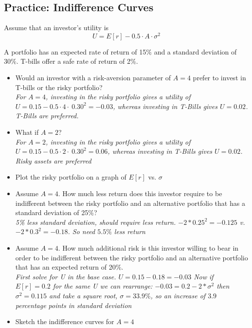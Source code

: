 \documentclass[11pt]{article}
\theoremstyle{definition}
\begin{document}
    \begin{shaded}
    \subsection{Practice: Indifference Curves}
    Assume that an investor's utility is
        $$U = E[r] - 0.5 \cdot A \cdot \sigma^2$$ 

    A portfolio has an expected rate of return of 15\% and a standard deviation of 30\%.  T-bills offer a safe rate of return of 2\%.   
    \begin{itemize}
        \item Would an investor with a risk-aversion parameter of $A=4$ prefer to invest in T-bills or the risky portfolio?   \\
        
        \textit{For $A=4$, investing in the risky portfolio gives a utility of $U = 0.15 - 0.5\cdot 4 \cdot \ 0.30^2 = -0.03$, whereas investing in T-Bills gives $U = 0.02$.   T-Bills are preferred.\\}
        \item What if $A=2$?\\
        
        \textit{For $A=2$, investing in the risky portfolio gives a utility of $U = 0.15 - 0.5\cdot 2 \cdot \ 0.30^2 = 0.06$, whereas investing in T-Bills gives $U = 0.02$.   Risky assets are preferred}

        \item Plot the risky portfolio on a graph of $E[r]$ vs. $\sigma$
        \item Assume $A=4$.   How much less return does this investor require to be indifferent between the risky portfolio and an alternative portfolio that has a standard deviation of 25\%?\\

        \textit{5\% less standard deviation, should require less return.   $-2*0.25^2 = -0.125$ v. $-2*0.3^2 = -0.18$.   So need $5.5\%$ less return}
        \item Assume $A=4$.   How much additional risk is this investor willing to bear in order to be indifferent between the risky portfolio and an alternative portfolio that has an expected return of 20\%.\\  

        \textit{First solve for U in the base case.   $U = 0.15 - 0.18 = -0.03$   Now if $E[r]=0.2$ for the same U we can rearrange: $-0.03 = 0.2 - 2*\sigma^2$ then $\sigma^2 = 0.115$ and take a square root, $\sigma=33.9\%$, so an increase of $3.9$ percentage points in standard deviation}
        \item Sketch the indifference curves for $A=4$


\end{itemize}
\end{shaded}
\end{document}
